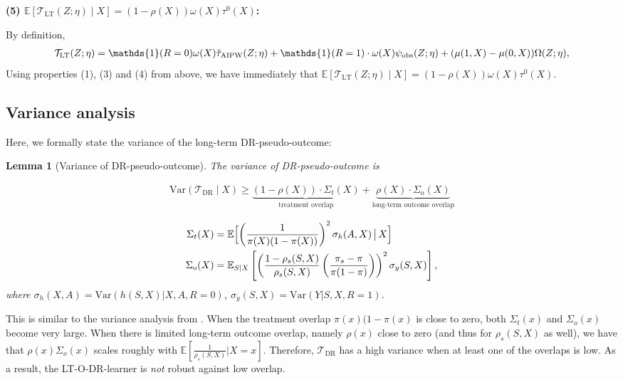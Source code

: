 \documentclass{article}
\theoremstyle{plain}
\newtheorem{lemma}[theorem]{Lemma}
\theoremstyle{definition}
\theoremstyle{remark}
\newcommand{\E}{\mathbb{E}}                %
\newcommand{\var}{\mathrm{Var}}            %
\newcommand{\1}{\mathds{1}}                %
\newcommand{\DR}{LT-O-DR-learner\xspace}
\begin{document}
\textbf{(5) $\E\left[\mathcal{T}_\mathrm{LT}(Z;\eta) \mid X\right] = (1-\rho(X))\omega(X) \tau^0(X)$:}

By definition, 
\begin{align}
    \mathcal{T}_\mathrm{LT}(Z;\eta) =  \1(R=0) \omega(X) \hat{\tau}_\mathrm{AIPW}(Z;\eta)
     +  \1(R=1) \cdot\omega(X) \psi_\mathrm{obs}(Z;\eta) + (\mu(1,X)-\mu(0,X)) \Omega(Z;\eta),\notag
\end{align}
Using properties (1), (3) and (4) from above, we have immediately that $\E\left[\mathcal{T}_\mathrm{LT}(Z;\eta) \mid X\right] = (1-\rho(X))\omega(X) \tau^0(X).$

\subsection{Variance analysis}
\label{app:variance}
Here, we formally state the variance of the long-term DR-pseudo-outcome:

\begin{lemma}[Variance of DR-pseudo-outcome]
\label{lemma-variance}
The variance of DR-pseudo-outcome is

\begin{align*}
    \var(\mathcal{T}_\mathrm{DR} \mid X) \geq \underbrace{(1-\rho(X)) \cdot \Sigma_{t}(X)}_{\text{treatment overlap}} + \underbrace{\rho(X) \cdot \Sigma_{\text{o}}(X)}_{\text{long-term outcome overlap}}
\end{align*}

\vspace{-0.6cm}
\footnotesize
\begin{align*}
    \Sigma_{t}(X) &= \mathbb{E}\Bigl[ \left(\frac{1}{\pi(X)(1-\pi(X))}\right)^2 \sigma_h(A,X) \,\big|\, X \Bigr]  \\
    \Sigma_{\text{o}}(X) &= \mathbb{E}_{S|X} \left[ \left(\frac{1-\rho_s(S,X)}{\rho_s(S,X)}\left(\frac{\pi_s-\pi}{\pi(1-\pi)}\right)\right)^2 \sigma_y(S,X) \right],
\end{align*}
where $\sigma_h(X,A)=\var(h(S,X)|X,A,R=0)$, $\sigma_y(S,X)=\var(Y|S,X,R=1)$.
\normalsize
\end{lemma}

This is similar to the variance analysis from \citet{Fisher.2023}. When the treatment overlap $\pi(x)(1-\pi(x)$ is close to zero, both $\Sigma_t(x)$ and $\Sigma_o(x)$ become very large. When there is limited long-term outcome overlap, namely $\rho(x)$ close to zero (and thus for $\rho_s(S,X)$ as well),  we have that $\rho(x)\Sigma_o(x)$ scales roughly with $\E[\frac{1}{\rho_s(S,X)}|X=x]$. Therefore, $\mathcal{T}_\mathrm{DR}$ has a high variance when at least one of the overlaps is low. As a result, the \DR is \emph{not} robust against low overlap.
\end{document}
